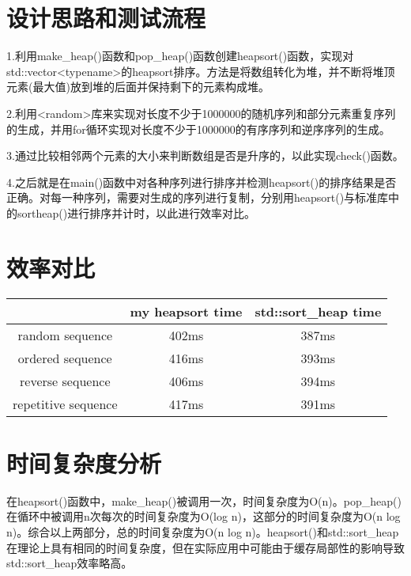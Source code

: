 \documentclass[UTF8]{ctexart}
\begin{document}
\pagestyle{fancy}
\fancyhead{}

\section{设计思路和测试流程}

1.利用make\_heap()函数和pop\_heap()函数创建heapsort()函数，实现对std::vector<typename>的heapsort排序。方法是将数组转化为堆，并不断将堆顶元素(最大值)放到堆的后面并保持剩下的元素构成堆。

2.利用<random>库来实现对长度不少于1000000的随机序列和部分元素重复序列的生成，并用for循环实现对长度不少于1000000的有序序列和逆序序列的生成。

3.通过比较相邻两个元素的大小来判断数组是否是升序的，以此实现check()函数。

4.之后就是在main()函数中对各种序列进行排序并检测heapsort()的排序结果是否正确。对每一种序列，需要对生成的序列进行复制，分别用heapsort()与标准库中的sortheap()进行排序并计时，以此进行效率对比。

\section{效率对比}

\begin{center}
\begin{tabular}{|c|c|c|}
	\hline
	  &  my heapsort time  &  std::sort\_heap time \\ \hline
	random sequence  &  402ms  &  387ms \\ \hline
	ordered sequence  &  416ms  &  393ms \\ \hline
	reverse sequence  &  406ms  &  394ms \\ \hline
	repetitive sequence  &  417ms  &  391ms \\ \hline
\end{tabular}
\end{center}

\section{时间复杂度分析}

在heapsort()函数中，make\_heap()被调用一次，时间复杂度为O(n)。pop\_heap()在循环中被调用n次每次的时间复杂度为O(log n)，这部分的时间复杂度为O(n log n)。综合以上两部分，总的时间复杂度为O(n log n)。heapsort()和std::sort\_heap在理论上具有相同的时间复杂度，但在实际应用中可能由于缓存局部性的影响导致std::sort\_heap效率略高。
\end{document}
